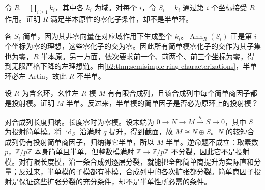 \begin{exercise}\label{b2:ex:13-infinite-product-semiprimitivity}
	令 \(R=\prod_{i\ge1}k_i\)，其中各 \(k_i\) 为域。对每个 \(i\)，令 \(S_i=k_i\) 通过第 \(i\) 个坐标接受 \(R\) 作用。证明 \(R\) 满足半本原性的零化子条件，却不是半单环。
\end{exercise}
\begin{solution}
	各 \(S_i\) 简单，因为其非零向量在对应域作用下生成整个 \(k_i\)。\(\operatorname{Ann}_R(S_i)\) 正是第 \(i\) 个坐标为零的理想，这些零化子的交为零。因此所有简单模零化子的交作为其子集也为零，\(R\) 半本原。另一方面，依次要求前一个、前两个、前三个坐标为零，得到无限严格下降的左理想链。由\cref{b2:thm:semisimple-ring-characterizations}，半单环必左 Artin，故此 \(R\) 不半单。
\end{solution}

\begin{exercise}\label{b2:ex:13-projective-factors}
	设 \(R\) 为含幺环，幺性左 \(R\) 模 \(M\) 有有限合成列，且该合成列中每个简单商因子都是投射模。证明 \(M\) 半单。反过来，半单模的简单因子是否必为原环上的投射模？
\end{exercise}
\begin{solution}
	对合成列长度归纳。长度零时为零模。设末端为 \(0\to N\to M\xrightarrow{q}S\to0\)，其中 \(S\) 为投射简单模。将 \(\operatorname{id}_S\) 沿满射 \(q\) 提升，得到截面，故 \(M\cong N\oplus S\)。\(N\) 的较短合成列仍有投射简单商因子，归纳得它半单，所以 \(M\) 半单。逆命题不成立：取素数 \(p\)，\(\mathbb Z/p\mathbb Z\) 本身简单且半单，但整数模满射 \(\mathbb Z\to\mathbb Z/p\mathbb Z\) 不分裂，因此它不是投射模。对有限长度模，沿一条合成列逐层分裂，就能把全部简单商提升为实际直和分量；反过来，半单模的子模都有补模，合成列中的各次扩张都分裂。简单商因子投射是保证这些扩张分裂的充分条件，却不是半单性所必需的条件。
\end{solution}
